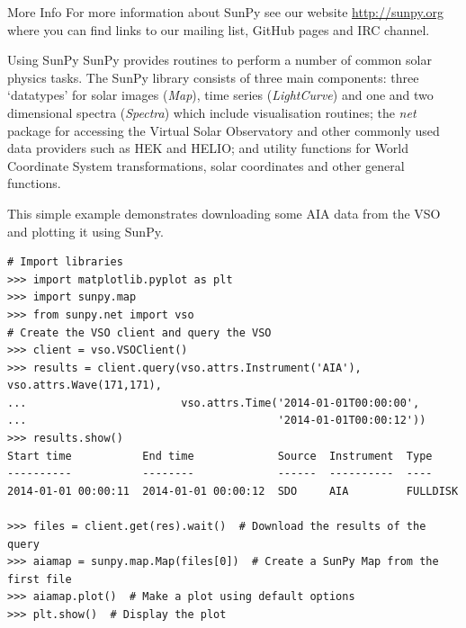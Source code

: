 \documentclass[a0paper,landscape]{baposter}
\begin{document}
\begin{poster}
\begin{posterbox}[name=acknoledgements,column=2,below=development,above=bottom]{More Info}
For more information about SunPy see our website \url{http://sunpy.org} where you can find links to our mailing list, GitHub pages and IRC channel.
\end{posterbox}

\begin{posterbox}[name=examples,span=2,column=0]{Using SunPy}
SunPy provides routines to perform a number of common solar physics tasks.
The SunPy library consists of three main components: three `datatypes' for solar images (\textit{Map}), time series (\textit{LightCurve}) and one and two dimensional spectra (\textit{Spectra}) which include visualisation routines; the \textit{net} package for accessing the Virtual Solar Observatory and other commonly used data providers such as HEK and HELIO; and utility functions for World Coordinate System transformations, solar coordinates and other general functions.

This simple example demonstrates downloading some AIA data from the VSO and plotting it using SunPy.
\begin{verbatim}
# Import libraries
>>> import matplotlib.pyplot as plt
>>> import sunpy.map
>>> from sunpy.net import vso
# Create the VSO client and query the VSO
>>> client = vso.VSOClient()
>>> results = client.query(vso.attrs.Instrument('AIA'), vso.attrs.Wave(171,171),
...                        vso.attrs.Time('2014-01-01T00:00:00',
...                                       '2014-01-01T00:00:12'))
>>> results.show()
Start time           End time             Source  Instrument  Type    
----------           --------             ------  ----------  ----    
2014-01-01 00:00:11  2014-01-01 00:00:12  SDO     AIA         FULLDISK

>>> files = client.get(res).wait()  # Download the results of the query
>>> aiamap = sunpy.map.Map(files[0])  # Create a SunPy Map from the first file
>>> aiamap.plot()  # Make a plot using default options
>>> plt.show()  # Display the plot
\end{verbatim}

\begin{figure}[H]
\centering

\end{figure}

\end{posterbox}


\end{poster}
\end{document}
